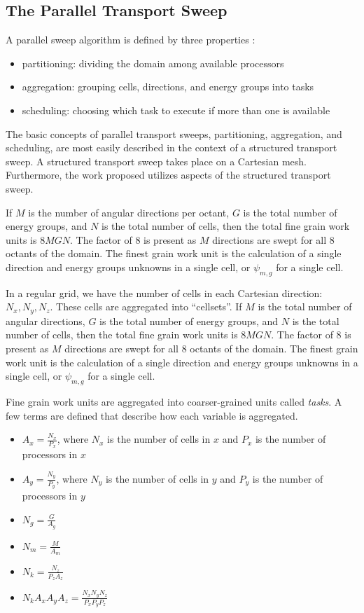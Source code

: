 \documentclass{anstrans}
\begin{document}
\subsection{The Parallel Transport Sweep}

A parallel sweep algorithm is defined by three properties \cite{mpadams2013} :
\begin{itemize}
\item partitioning: dividing the domain among available processors
\item aggregation: grouping cells, directions, and energy groups into tasks
\item scheduling: choosing which task to execute if more than one is available
\end{itemize}

The basic concepts of parallel transport sweeps, partitioning, aggregation, and scheduling, are most easily described in the context of a structured transport sweep. A structured transport sweep takes place on a Cartesian mesh. Furthermore, the work proposed utilizes aspects of the structured transport sweep.

If $M$ is the number of angular directions per octant, $G$ is the total number of energy groups, and $N$ is the total number of cells, then the total fine grain work units is $8MGN$. The factor of 8 is present as $M$ directions are swept for all 8 octants of the domain. The finest grain work unit is the calculation of a single direction and energy groups unknowns in a single cell, or $\psi_{m,g}$ for a single cell.

In a regular grid, we have the  number of cells in each Cartesian direction: $N_x, N_y, N_z$. These cells are aggregated into ``cellsets''. If $M$ is the total number of angular directions, $G$ is the total number of energy groups, and $N$ is the total number of cells, then the total fine grain work units is $8MGN$. The factor of 8 is present as $M$ directions are swept for all 8 octants of the domain. The finest grain work unit is the calculation of a single direction and energy groups unknowns in a single cell, or $\psi_{m,g}$ for a single cell.

Fine grain work units are aggregated into coarser-grained units called \textit{tasks}. A few terms are defined that describe how each variable is aggregated.
\begin{itemize}
\item $A_x = \frac{N_x}{P_x}$, where $N_x$ is the number of cells in $x$ and $P_x$ is the number of processors in $x$
\item $A_y = \frac{N_y}{P_y}$, where $N_y$ is the number of cells in $y$ and $P_y$ is the number of processors in $y$
\item $N_g = \frac{G}{A_g}$
\item $N_m = \frac{M}{A_m}$
\item $N_k = \frac{N_z}{P_z A_z}$
\item $N_k A_x A_y A_z = \frac{N_x N_y N_z}{P_x P_y P_z}$
\end{itemize}
\end{document}
